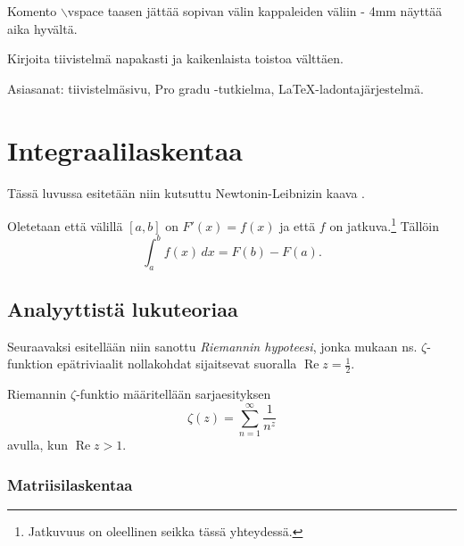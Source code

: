 \vspace{4mm}\noindent Komento $\backslash$vspace taasen jättää sopivan välin kappaleiden väliin - 4mm näyttää aika hyvältä.

\vspace{4mm}\noindent Kirjoita tiivistelmä napakasti ja kaikenlaista toistoa välttäen.

\vspace{4mm}\noindent Asiasanat: tiivistelmäsivu, Pro gradu -tutkielma, \LaTeX-ladontajärjestelmä.




\cleardoublepage

\tableofcontents

\cleardoublepage

\pagestyle{plain} 

\section{Integraalilaskentaa}

Tässä luvussa esitetään niin kutsuttu Newtonin-Leibnizin kaava \cite{NewtLeib}.

\begin{theorem} Oletetaan että välillä $[a,b]$ on $F'(x)=f(x)$ ja että $f$ on jatkuva.\footnote{Jatkuvuus on oleellinen seikka tässä yhteydessä.} Tällöin
\[
\int_a^bf(x)\,dx=F(b)-F(a).
\]
\end{theorem}

\subsection{Analyyttistä lukuteoriaa}

Seuraavaksi esitellään niin sanottu {\em Riemannin hypoteesi}, jonka mukaan ns. $\zeta$-funktion epätriviaalit nollakohdat sijaitsevat suoralla $\operatorname{Re}z=\frac12$.
\begin{definition} Riemannin $\zeta$-funktio määritellään sarjaesityksen \cite{Riemann}
\[
\zeta(z)=\sum_{n=1}^{\infty}\frac{1}{n^z}
\]
avulla, kun $\operatorname{Re}z>1$.
\end{definition}

\subsubsection{Matriisilaskentaa}

